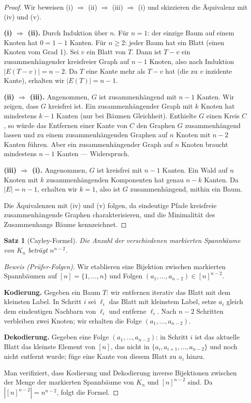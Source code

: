 \documentclass[12pt,a4paper]{amsart}
\newtheorem{theorem}{Satz}[section]
\theoremstyle{definition}
\theoremstyle{remark}
\begin{document}
\begin{proof}
Wir beweisen (i) $\Rightarrow$ (ii) $\Rightarrow$ (iii) $\Rightarrow$ (i)
und skizzieren die Äquivalenz mit (iv) und (v).

\medskip
\noindent\textbf{(i) $\Rightarrow$ (ii).}
Durch Induktion über $n$. Für $n = 1$: der einzige Baum auf einem Knoten
hat $0 = 1-1$ Kanten. Für $n \ge 2$: jeder Baum hat ein Blatt (einen Knoten
vom Grad 1). Sei $v$ ein Blatt von $T$. Dann ist $T - v$ ein zusammen\-hängender
kreisfreier Graph auf $n - 1$ Knoten, also nach Induktion
$|E(T-v)| = n - 2$. Da $T$ eine Kante mehr als $T - v$ hat (die zu $v$
inzidente Kante), erhalten wir $|E(T)| = n - 1$.

\medskip
\noindent\textbf{(ii) $\Rightarrow$ (iii).}
Angenommen, $G$ ist zusammenhängend mit $n - 1$ Kanten. Wir zeigen, dass $G$
kreisfrei ist. Ein zusammenhängender Graph mit $k$ Knoten hat mindestens $k - 1$
Kanten (nur bei Bäumen Gleichheit). Enthielte $G$ einen Kreis $C$, so würde
das Entfernen einer Kante von $C$ den Graphen $G$ zusammenhängend lassen und
zu einem zusammenhängenden Graphen auf $n$ Knoten mit $n-2$ Kanten führen.
Aber ein zusammenhängender Graph auf $n$ Knoten braucht mindestens $n-1$
Kanten --- Widerspruch.

\medskip
\noindent\textbf{(iii) $\Rightarrow$ (i).}
Angenommen, $G$ ist kreisfrei mit $n - 1$ Kanten. Ein Wald auf $n$ Knoten
mit $k$ zusammenhängenden Komponenten hat genau $n - k$ Kanten. Da $|E| = n - 1$,
erhalten wir $k = 1$, also ist $G$ zusammenhängend, mithin ein Baum.

\medskip
\noindent Die Äquivalenzen mit (iv) und (v) folgen, da eindeutige Pfade
kreisfreie zusammenhängende Graphen charakterisieren, und die Minimalität
des Zusammenhangs Bäume kennzeichnet.
\end{proof}

\begin{theorem}[Cayley-Formel]
\label{satz:cayley}
Die Anzahl der verschiedenen markierten Spannbäume von $K_n$ beträgt $n^{n-2}$.
\end{theorem}

\begin{proof}[Beweis (Prüfer-Folgen)]
Wir etablieren eine Bijektion zwischen markierten Spannbäumen auf
$[n] = \{1, \ldots, n\}$ und Folgen $(a_1, \ldots, a_{n-2}) \in [n]^{n-2}$.

\textbf{Kodierung.} Gegeben ein Baum $T$: wir entfernen iterativ das Blatt
mit dem kleinsten Label. In Schritt $i$ sei $\ell_i$ das Blatt mit kleinstem
Label, setze $a_i$ gleich dem eindeutigen Nachbarn von $\ell_i$ und entferne
$\ell_i$. Nach $n - 2$ Schritten verbleiben zwei Knoten; wir erhalten die
Folge $(a_1, \ldots, a_{n-2})$.

\textbf{Dekodierung.} Gegeben eine Folge $(a_1, \ldots, a_{n-2})$: in Schritt
$i$ ist das aktuelle Blatt das kleinste Element von $[n]$, das nicht in
$\{a_i, a_{i+1}, \ldots, a_{n-2}\}$ und noch nicht entfernt wurde; füge eine
Kante von diesem Blatt zu $a_i$ hinzu.

Man verifiziert, dass Kodierung und Dekodierung inverse Bijektionen zwischen
der Menge der markierten Spannbäume von $K_n$ und $[n]^{n-2}$ sind. Da
$|[n]^{n-2}| = n^{n-2}$, folgt die Formel.
\end{proof}
\end{document}
